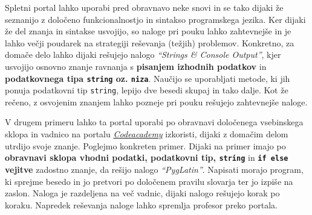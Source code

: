 Spletni portal lahko uporabi pred obravnavo neke snovi in se tako
dijaki že seznanijo z določeno funkcionalnostjo in sintakso
programskega jezika. Ker dijaki že del znanja in sintakse usvojijo, so
naloge pri pouku lahko zahtevnejše in je lahko večji poudarek na
strategiji reševanja (težjih) problemov. Konkretno, za domače delo
lahko dijaki rešujejo nalogo \emph{``Strings \& Console Output''}, kjer
usvojijo osnovno znanje ravnanja s \textbf{pisanjem izhodnih podatkov}
in \textbf{podatkovnega tipa \texttt{string} oz. \texttt{niza}}. Naučijo se
uporabljati metode, ki jih ponuja podatkovni tip \texttt{string},
lepijo dve besedi skupaj in tako dalje. Kot že rečeno, z osvojenim
znanjem lahko pozneje pri pouku rešujejo zahtevnejše naloge.

V drugem primeru lahko ta portal uporabi po obravnavi določenega
vsebinskega sklopa in vadnico na portalu
\emph{\href{https://www.codecademy.com/}{Codeacademy}}
\cite{web:codeacademy} izkoristi, dijaki z domačim delom utrdijo svoje
znanje. Poglejmo konkreten primer. Dijaki na primer imajo  po
\textbf{obravnavi sklopa vhodni podatki, podatkovni tip,
  \texttt{string}} in \textbf{\texttt{if else} vejitve} 
zadostno znanje, da rešijo nalogo \emph{``PygLatin''}. Napisati morajo
program, ki sprejme besedo in jo pretvori po določenem pravilu
slovarja ter jo izpiše na zaslon. Naloga je razdeljena na več vadnic,
dijaki nalogo rešujejo korak po koraku. Napredek
reševanja naloge lahko spremlja profesor preko portala.

